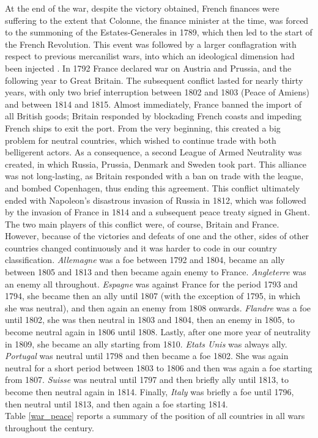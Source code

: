 \documentclass[12pt,a4paper,notitlepage,english]{article}
\begin{document}
At the end of the war, despite the victory obtained, French finances were suffering to the extent that Colonne, the finance minister at the time, was forced to the summoning of the Estates-Generales in 1789, which then led to the start of the French Revolution. This event was followed by a larger conflagration with respect to previous mercanilist wars, into which an ideological dimension had been injected \citep{o2006worldwide}. In 1792 France declared war on Austria and Prussia, and the following year to Great Britain. The subsequent conflict lasted for nearly thirty years, with only two brief interruption between 1802 and 1803 (Peace of Amiens) and between 1814 and 1815. Almost immediately, France banned the import of all British goods; Britain responded by blockading French coasts and impeding French ships to exit the port. From the very beginning, this created a big problem for neutral countries, which wished to continue trade with both belligerent actors. As a consequence, a second League of Armed Neutrality was created, in which Russia, Prussia, Denmark and Sweden took part. This alliance was not long-lasting, as Britain responded with a ban on trade with the league, and bombed Copenhagen, thus ending this agreement. This conflict ultimately ended with Napoleon's disastrous invasion of Russia in 1812, which was followed by the invasion of France in 1814 and a subsequent peace treaty signed in Ghent. The two main players of this conflict were, of course, Britain and France. However, because of the victories and defeats of one and the other, sides of other countries changed continuously and it was harder to code in our country classification. \textit{Allemagne} was a foe between 1792 and 1804, became an ally between 1805 and 1813 and then became again enemy to France. \textit{Angleterre} was an enemy all throughout. \textit{Espagne} was against France for the period 1793 and 1794, she became then an ally until 1807 (with the exception of 1795, in which she was neutral), and then again an enemy from 1808 onwards. \textit{Flandre} was a foe until 1802, she was then neutral in 1803 and 1804, then an enemy in 1805, to become neutral again in 1806 until 1808. Lastly, after one more year of neutrality in 1809, she became an ally starting from 1810. \textit{Etats Unis} was always ally. \textit{Portugal} was neutral until 1798 and then became a foe 1802. She was again neutral for a short period between 1803 to 1806 and then was again a foe starting from 1807. \textit{Suisse} was neutral until 1797 and then briefly ally until 1813, to become then neutral again in 1814. Finally, \textit{Italy} was briefly a foe until 1796, then neutral until 1813, and then again a foe starting 1814.  \\
Table \ref{war_peace} reports a summary of the position of all countries in all wars throughout the century.
\end{document}
